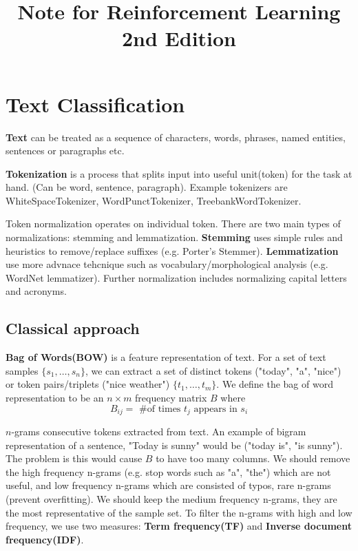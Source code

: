 \documentclass[twocolumn, 10pt]{article}
\title{Note for Reinforcement Learning 2nd Edition}
\begin{document}
\maketitle

\section*{Text Classification}
\textbf{Text} can be treated as a sequence of characters, words, phrases, named entities,  sentences or paragraphs etc.

\textbf{Tokenization} is a process that splits input into useful unit(token) for the task at hand. (Can be word, sentence, paragraph). Example tokenizers are WhiteSpaceTokenizer,  WordPunctTokenizer, TreebankWordTokenizer. 

Token normalization operates on individual token. There are two main types of normalizations:  stemming and lemmatization. \textbf{Stemming} uses simple rules and heuristics to remove/replace suffixes (e.g. Porter's Stemmer). \textbf{Lemmatization} use more advnace tehcnique such as vocabulary/morphological analysis (e.g. WordNet lemmatizer). Further normalization includes normalizing capital letters and acronyms.

\subsection*{Classical approach}
\textbf{Bag of Words(BOW)} is a feature representation of text. For a set of text samples $\{s_1, \ldots, s_n\}$, we can extract  a set of distinct tokens ("today", "a", "nice") or token pairs/triplets ("nice weather") $\{t_1, \ldots, t_m \}$. We define the bag of word representation  to be an $n \times m$ frequency matrix $B$ where $$B_{ij} = \mbox{ \# of times  } t_j \mbox{  appears in  } s_i$$ 

$n$-grams consecutive tokens extracted from text. An example of bigram representation of a sentence, "Today is sunny" would be ("today is", "is sunny"). The problem is this would cause $B$ to have too many columns. We should remove the high frequency n-grams (e.g. stop words such as "a", "the") which are not useful, and low frequency n-grams which are consisted of typos, rare n-grams (prevent overfitting).  We should keep the medium frequency n-grams, they are the most representative of the sample set. To filter the n-grams with high and low frequency, we use two measures: \textbf{Term frequency(TF)} and \textbf{Inverse document frequency(IDF)}.
\end{document}

